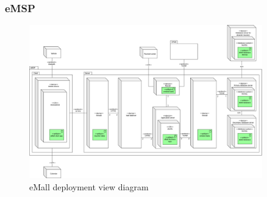 \subsubsection{\ac{eMSP}}
\begin{figure}[!h]
    \begin{center}
        \includegraphics[keepaspectratio, width=0.9\textwidth]{Graphics/DD-eMSP-deployment.drawio.png}
        \caption{eMall deployment view diagram}
        \label{fig:eMSP-deployment}
    \end{center}
\end{figure}

